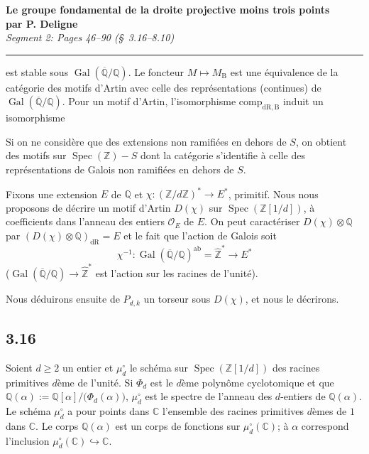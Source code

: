 \documentclass[12pt,a4paper]{article}
\theoremstyle{plain}
\theoremstyle{definition}
\theoremstyle{remark}
\DeclareMathOperator{\Spec}{Spec}
\DeclareMathOperator{\Gal}{Gal}
\newcommand{\DR}{\mathrm{dR}}
\newcommand{\B}{\mathrm{B}}
\newcommand{\OO}{\mathcal{O}}
\newcommand{\Z}{\mathbb{Z}}
\newcommand{\Q}{\mathbb{Q}}
\newcommand{\C}{\mathbb{C}}
\begin{document}
\begin{center}
\Large\textbf{Le groupe fondamental de la droite projective moins trois points}\\[0.5em]
\large\textbf{par P. Deligne}\\[1em]
\normalsize\textit{Segment 2: Pages 46--90 (\S\ 3.16--8.10)}
\end{center}

\vspace{1em}
\hrule
\vspace{1em}

\setcounter{section}{3}

est stable sous $\Gal(\overline{\Q}/\Q)$. Le foncteur $M \mapsto M_{\B}$ est une \'equivalence de la cat\'egorie des motifs d'Artin avec celle des repr\'esentations (continues) de $\Gal(\overline{\Q}/\Q)$. Pour un motif d'Artin, l'isomorphisme $\mathrm{comp}_{\DR,\B}$ induit un isomorphisme

Si on ne consid\`ere que des extensions non ramifi\'ees en dehors de $S$, on obtient des motifs sur $\Spec(\Z) - S$ dont la cat\'egorie s'identifie \`a celle des repr\'esentations de Galois non ramifi\'ees en dehors de $S$.

Fixons une extension $E$ de $\Q$ et $\chi: (\Z/d\Z)^* \to E^*$, primitif. Nous nous proposons de d\'ecrire un motif d'Artin $D(\chi)$ sur $\Spec(\Z[1/d])$, \`a coefficients dans l'anneau des entiers $\OO_E$ de $E$. On peut caract\'eriser $D(\chi) \otimes \Q$ par $(D(\chi) \otimes \Q)_{\DR} = E$ et le fait que l'action de Galois soit
\[
\chi^{-1}: \Gal(\overline{\Q}/\Q)^{\mathrm{ab}} = \hat{\Z}^* \longrightarrow E^*
\]
($\Gal(\overline{\Q}/\Q) \to \hat{\Z}^*$ est l'action sur les racines de l'unit\'e).

Nous d\'eduirons ensuite de $P_{d,k}$ un torseur sous $D(\chi)$, et nous le d\'ecrirons.

\subsection*{3.16}

Soient $d \geq 2$ un entier et $\mu_d^\circ$ le sch\'ema sur $\Spec(\Z[1/d])$ des racines primitives $d$\`eme de l'unit\'e. Si $\Phi_d$ est le $d$\`eme polyn\^ome cyclotomique et que $\Q(\alpha) := \Q[\alpha]/\bigl(\Phi_d(\alpha)\bigr)$, $\mu_d^\circ$ est le spectre de l'anneau des $d$-entiers de $\Q(\alpha)$. Le sch\'ema $\mu_d^\circ$ a pour points dans $\C$ l'ensemble des racines primitives $d$\`emes de $1$ dans $\C$. Le corps $\Q(\alpha)$ est un corps de fonctions sur $\mu_d^\circ(\C)$; \`a $\alpha$ correspond l'inclusion $\mu_d^\circ(\C) \hookrightarrow \C$.
\end{document}
